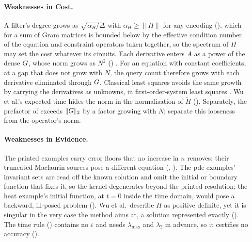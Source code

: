 \paragraph{Weaknesses in Cost.} A filter's degree grows as $\sqrt{\alpha_H/\Delta}$ with $\alpha_H\ge\|H\|$ for any encoding (), which for a sum of Gram matrices is bounded below by the effective condition number of the equation and constraint operators taken together, so the spectrum of $H$ may set the cost whatever its circuits. Each derivative enters $A$ as a power of the dense $G$, whose norm grows as $N^2$ () \cite{olver2013}. For an equation with constant coefficients, at a gap that does not grow with $N$, the query count therefore grows with each derivative eliminated through $G$. Classical least squares avoids the same growth by carrying the derivatives as unknowns, in first-order-system least squares \cite{cai1994fosls}. Wu et al.'s expected time hides the norm in the normalisation of $\tilde H$ (). Separately, the prefactor of  exceeds $\|G\|_2$ by a factor growing with $N$;  separate this looseness from the operator's norm.

\paragraph{Weaknesses in Evidence.} The printed examples carry error floors that no increase in $n$ removes: their truncated Maclaurin sources pose a different equation (, ). The \gls{pde} examples' invariant sets are read off the known solution and omit the initial or boundary function that fixes it, so the kernel degenerates beyond the printed resolution; the heat example's initial function, at $t=0$ inside the time domain, would pose a backward, ill-posed problem (). Wu et al.\ describe $H$ as positive definite, yet it is singular in the very case the method aims at, a solution represented exactly (). The time rule () contains no $\varepsilon$ and needs $\lambda_{\max}$ and $\lambda_2$ in advance, so it certifies no accuracy ().

